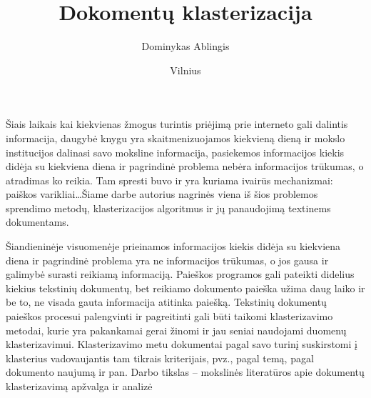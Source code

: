 \documentclass[draft]{VUMIFInfKursinis}
\title{Dokomentų klasterizacija}
\author{Dominykas Ablingis}
\date{Vilnius \\ \the\year}
\begin{document}

\newcommand{\ltang}[2]{#1 (angl.\  \textit{#2}) }
\newcommand{\BigO}[1]{$\mathcal{O}(#1)$}

	\newcommand{\rewrite}[2]{\todo[linecolor=red,backgroundcolor=red!25,bordercolor=red,#1]{#2}}
	\newcommand{\needsource}[1]{\todo[linecolor=blue,backgroundcolor=blue!25,bordercolor=blue,]{#1}}
	\newcommand{\toadd}[1]{\todo[linecolor=OliveGreen,backgroundcolor=OliveGreen!25,bordercolor=OliveGreen,]{#1}}
	\newcommand{\note}[2]{\todo[linecolor=Plum,backgroundcolor=Plum!25,bordercolor=Plum]{#1}}
	\newcommand{\thiswillnotshow}[2]{\todo[disable,#1]{#2}}

	\listoftodos[Notes]

\maketitle

\tableofcontents


Šiais laikais kai kiekvienas žmogus turintis priėjimą prie interneto gali dalintis informacija, daugybė knygu yra skaitmenizuojamos kiekvieną dieną ir mokslo institucijos dalinasi savo moksline informacija, pasiekemos informacijos kiekis didėja su kiekviena diena ir pagrindinė problema nebėra informacijos trūkumas, o atradimas ko reikia. Tam spresti buvo ir yra kuriama ivairūs mechanizmai: paiškos varikliai\ldots Šiame darbe autorius nagrinės viena iš šios problemos sprendimo metodų, klasterizacijos algoritmus ir jų panaudojimą textinems dokumentams. %

Šiandieninėje visuomenėje prieinamos informacijos kiekis didėja su kiekviena diena ir pagrindinė problema yra ne informacijos trūkumas, o jos gausa ir galimybė surasti reikiamą informaciją. Paieškos programos gali pateikti didelius kiekius tekstinių dokumentų, bet reikiamo dokumento paieška užima daug laiko ir be to, ne visada gauta informacija atitinka paiešką. Tekstinių dokumentų paieškos procesui palengvinti ir pagreitinti gali būti taikomi klasterizavimo metodai, kurie yra pakankamai gerai žinomi ir jau seniai naudojami duomenų klasterizavimui.  Klasterizavimo metu  dokumentai pagal savo turinį suskirstomi į klasterius vadovaujantis tam tikrais kriterijais, pvz., pagal temą, pagal dokumento naujumą ir pan. 
Darbo tikslas – mokslinės literatūros apie dokumentų klasterizavimą apžvalga ir analizė  
\end{document}
